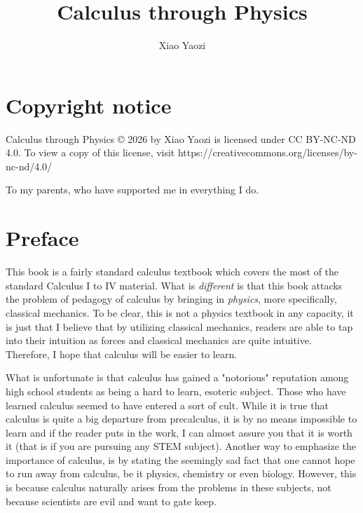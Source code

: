 \documentclass[envcountchap]{SNmono}
\title{Calculus through Physics}
\author{Xiao Yaozi}
\date{}
\begin{document}
  \frontmatter
  
  \maketitle
  \chapter*{Copyright notice}
  \vspace*{\fill}
    Calculus through Physics  © 2026 by Xiao Yaozi is licensed under CC BY-NC-ND 4.0. To view a copy of this license, visit https://creativecommons.org/licenses/by-nc-nd/4.0/
  \begin{dedication}
    To my parents, who have supported me in everything I do.
  \end{dedication}
  \chapter*{Preface}
  
  This book is a fairly standard calculus textbook which covers the most of the standard Calculus I to IV material. What is \textit{different} is that this book attacks the problem of pedagogy of calculus by bringing in \textit{physics}, more specifically, classical mechanics. To be clear, this is not a physics textbook in any capacity, it is just that I believe that by utilizing classical mechanics, readers are able to tap into their intuition as forces and classical mechanics are quite intuitive. Therefore, I hope that calculus will be easier to learn.


  What is unfortunate is that calculus has gained a "notorious" reputation among high school students as being a hard to learn, esoteric subject. Those who have learned calculus seemed to have entered a sort of cult. While it is true that calculus is quite a big departure from precalculus, it is by no means impossible to learn and if the reader puts in the work, I can almost assure you that it is worth it (that is if you are pursuing any STEM subject). Another way to emphasize the importance of calculus, is by stating the seemingly sad fact that one cannot hope to run away from calculus, be it physics, chemistry or even biology. However, this is because calculus naturally arises from the problems in these subjects, not because scientists are evil and want to gate keep. 
\end{document}
